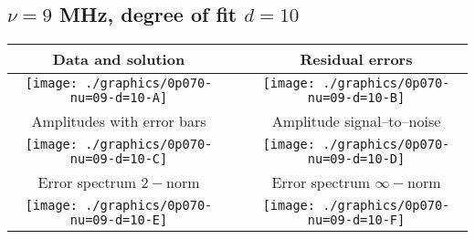 

% 

\clearpage{}
\break{}

\subsection{$\nu = 9$ MHz, degree of fit $d = 10$}

\begin{table}[h]
    \begin{center}
        \begin{tabular}{ccc}
            Data and solution & \quad & Residual errors \\\hline
            \texttt{[image: ./graphics/0p070-nu=09-d=10-A]} &&
            \texttt{[image: ./graphics/0p070-nu=09-d=10-B]} \\[15pt]
            Amplitudes with error bars && Amplitude signal--to--noise \\\hline
            \texttt{[image: ./graphics/0p070-nu=09-d=10-C]} &&
            \texttt{[image: ./graphics/0p070-nu=09-d=10-D]} \\[15pt]
            Error spectrum $2-$norm && Error spectrum $\infty-$norm \\\hline
            \texttt{[image: ./graphics/0p070-nu=09-d=10-E]} &&
            \texttt{[image: ./graphics/0p070-nu=09-d=10-F]} \\[15pt]
        \end{tabular}
    \end{center}
\label{fig:elev=70, nu=9}
\end{table}



\endinput
